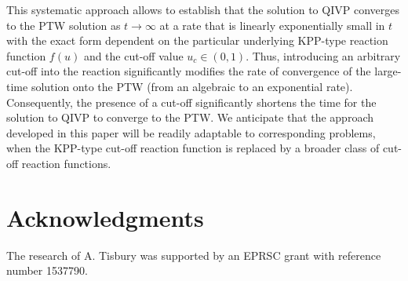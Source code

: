 \documentclass[11pt,a4paper]{article}
\begin{document}
%
This systematic approach 
allows to establish that the solution to QIVP 
converges to the PTW solution  
as $t\to\infty$ at a rate that   is linearly exponentially  small in $t$    
with the exact form dependent on the particular underlying KPP-type reaction function $f(u)$ and the cut-off value $u_c \in (0,1)$. 
%
Thus, introducing an arbitrary cut-off into the reaction   significantly modifies the    rate of convergence of the large-time solution onto the PTW (from an algebraic   to an exponential rate). Consequently, the presence of a cut-off significantly 
shortens 
  the time for the solution to QIVP to converge to the PTW. 
%
We anticipate that the approach developed in this paper 
will be readily adaptable to corresponding problems, when the KPP-type cut-off reaction function is replaced by a broader class of cut-off reaction functions. 


\section*{Acknowledgments}
The research of A. Tisbury was supported by an EPRSC grant with reference number 1537790.

\appendix 
\end{document}
